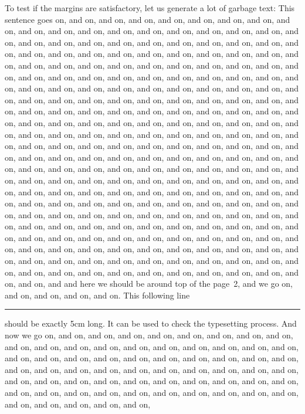 \documentclass[12pt]{dalthesis}
\begin{document}
To test if the margins are satisfactory, let us generate a lot of
garbage text:
This sentence goes on, and on, and on, and on,
and on, and on, and on, and on, and on, and on, and on, and on, and on,
and on, and on, and on, and on, and on, and on, and on, and on, and on,
and on, and on, and on, and on, and on, and on, and on, and on, and on,
and on, and on, and on, and on, and on, and on, and on, and on, and on,
and on, and on, and on, and on, and on, and on, and on, and on, and on,
and on, and on, and on, and on, and on, and on, and on, and on, and on,
and on, and on, and on, and on, and on, and on, and on, and on, and on,
and on, and on, and on, and on, and on, and on, and on, and on, and on,
and on, and on, and on, and on, and on, and on, and on, and on, and on,
and on, and on, and on, and on, and on, and on, and on, and on, and on,
and on, and on, and on, and on, and on, and on, and on, and on, and on,
and on, and on, and on, and on, and on, and on, and on, and on, and on,
and on, and on, and on, and on, and on, and on, and on, and on, and on,
and on, and on, and on, and on, and on, and on, and on, and on, and on,
and on, and on, and on, and on, and on, and on, and on, and on, and on,
and on, and on, and on, and on, and on, and on, and on, and on, and on,
and on, and on, and on, and on, and on, and on, and on, and on, and on,
and on, and on, and on, and on, and on, and on, and on, and on, and on,
and on, and on, and on, and on, and on, and on, and on, and on, and on,
and on, and on, and on, and on, and on, and on, and on, and on, and on,
and on, and on, and on, and on, and on, and on, and on, and on, and on,
and on, and on, and on, and on, and on, and on, and on, and on, and on,
and on, and on, and on, and on, and on, and on, and on, and on, and on,
and on, and on, and on, and on, and on, and on, and on, and on, and on,
and on, and on, and on, and on, and on, and on, and on, and on, and on,
and on, and
and here we should be around top of the page~2, and we go on, and on, and on, and on, and on.
This following line \rule{5cm}{1pt} should be exactly 5cm long.  It
can be used to check the typesetting process.
And now we go on,
and on, and on, and on, and on, and on, and on, and on, and on, and on,
and on, and on, and on, and on, and on, and on, and on, and on, and on,
and on, and on, and on, and on, and on, and on, and on, and on, and on,
and on, and on, and on, and on, and on, and on, and on, and on, and on,
and on, and on, and on, and on, and on, and on, and on, and on, and on,
and on, and on, and on, and on, and on, and on, and on, and on, and on,
and on, and on, and on, and on, and on, and on, and on, and on, and on,
\end{document}
